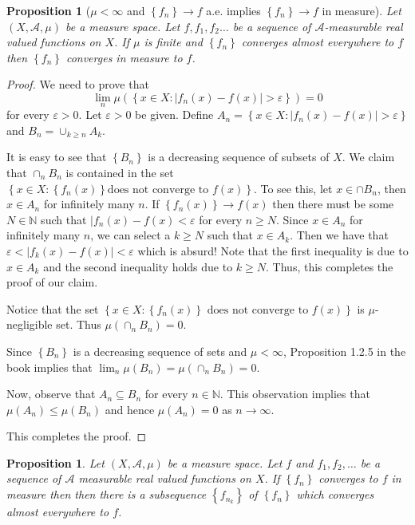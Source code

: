 \documentclass[12pt]{article}
\newtheorem{proposition}[theorem]{Proposition}
\theoremstyle{definition}
\theoremstyle{remark}
\theoremstyle{plain}
\newcommand{\N}{\mathbb N}
\newcommand{\scrA}{{\mathscr A}}
\begin{document}
\begin{proposition}[$\mu<\infty$ and $\left\{ f_n \right\}\to f$ a.e. implies $\left\{ f_n \right\}\to f$ in measure]
    Let $(X, \scrA, \mu )$ be a measure space. Let $f, f_1, f_2 \ldots $ be a sequence of $\scrA$-measurable real valued functions on $X$. If $\mu$ is finite and $\left\{ f_n \right\}$ converges almost everywhere to $f$ then $\left\{ f_n \right\}$ converges in measure to $f$.
\end{proposition}
\begin{proof}
   We need to prove that
   $$\lim_n \mu \left( \left\{ x\in X : |f_n (x) -f(x)| > \varepsilon \right\} \right) = 0$$
   for every $\varepsilon > 0$. Let $\varepsilon > 0 $ be given. Define $A_n=\left\{ x\in X : |f_n (x) -f(x)| > \varepsilon \right\}$ and $B_n = \cup _{k\ge n} A_k$.

   It is easy to see that $\left\{ B_n \right\}$ is a decreasing sequence of subsets of $X$. We claim that $\cap_{n} B_n$ is contained in the set $\left\{ x\in X : \left\{ f_n \left( x \right) \right\} \text{does not converge to } f\left( x \right) \right\}$. To see this, let $x\in \cap B_n$, then $x\in A_n$ for infinitely many $n$. If $\left\{ f_n (x) \right\} \to f \left( x \right)$ then there must be some $N\in\N$ such that $|f_n \left( x \right) - f\left( x \right)< \varepsilon$ for every $n\ge N$. Since $x\in A_n$ for infinitely many $n$, we can select a $k\ge N$ such that $x\in A_k$. Then we have that $\varepsilon < |f_k (x) -f(x)| < \varepsilon$ which is absurd! Note that the first inequality is due to $x\in A_k$ and the second inequality holds due to $k \ge N$. Thus, this completes the proof of our claim.

   Notice that the set $\left\{ x\in X : \left\{ f_n (x) \right\} \text{ does not converge to } f\left( x \right) \right\}$ is $\mu$- negligible set. Thus $\mu \left( \cap _n B_n \right) = 0$.

   Since $\left\{ B_n \right\}$ is a decreasing sequence of sets and $\mu < \infty$, Proposition 1.2.5 in the book implies that $\lim _n \mu \left( B_n \right) = \mu \left( \cap _n B_n \right) = 0$.

   Now, observe that $A_n \subseteq B_n$ for every $n\in \N$. This observation implies that $\mu (A_n) \le \mu \left( B_n \right)$ and hence $\mu \left( A_n \right) = 0$ as $n\to \infty$.
   
   This completes the proof.
\end{proof}

\begin{proposition}
    Let $\left( X, \scrA , \mu \right)$ be a measure space. Let $f$ and $f_1 , f_2, \ldots$ be a sequence of $\scrA$ measurable real valued functions on $X$. If $\left\{ f_n \right\}$ converges to $f$ in measure then then there is a subsequence $\left\{ f_{n_k} \right\}$ of $\left\{ f_n \right\}$ which converges almost everywhere to $f$.
\end{proposition}
\end{document}
